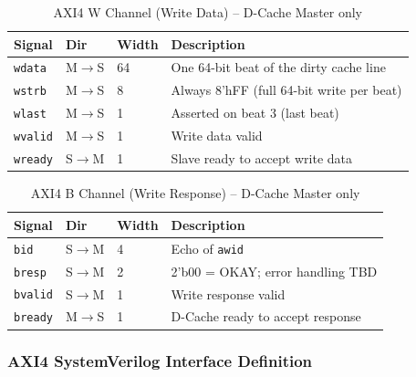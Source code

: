 \begin{table}[H]
\caption{AXI4 W Channel (Write Data) -- D-Cache Master only}
\label{tab:asAxi4WCh}
\centering
\begin{tabularx}{\textwidth}{|l |l |l |X|}
  \hline
  Signal & Dir & Width & Description \\
  \hline
  \hline
  \texttt{wdata}  & M$\to$S & 64 & One 64-bit beat of the dirty cache line \\
  \hline
  \texttt{wstrb}  & M$\to$S & 8  & Always 8'hFF (full 64-bit write per beat) \\
  \hline
  \texttt{wlast}  & M$\to$S & 1  & Asserted on beat 3 (last beat) \\
  \hline
  \texttt{wvalid} & M$\to$S & 1  & Write data valid \\
  \hline
  \texttt{wready} & S$\to$M & 1  & Slave ready to accept write data \\
  \hline
\end{tabularx}
\end{table}

\begin{table}[H]
\caption{AXI4 B Channel (Write Response) -- D-Cache Master only}
\label{tab:asAxi4BCh}
\centering
\begin{tabularx}{\textwidth}{|l |l |l |X|}
  \hline
  Signal & Dir & Width & Description \\
  \hline
  \hline
  \texttt{bid}    & S$\to$M & 4 & Echo of \texttt{awid} \\
  \hline
  \texttt{bresp}  & S$\to$M & 2 & 2'b00 = OKAY; error handling TBD \\
  \hline
  \texttt{bvalid} & S$\to$M & 1 & Write response valid \\
  \hline
  \texttt{bready} & M$\to$S & 1 & D-Cache ready to accept response \\
  \hline
\end{tabularx}
\end{table}

\subsubsection{AXI4 SystemVerilog Interface Definition}

